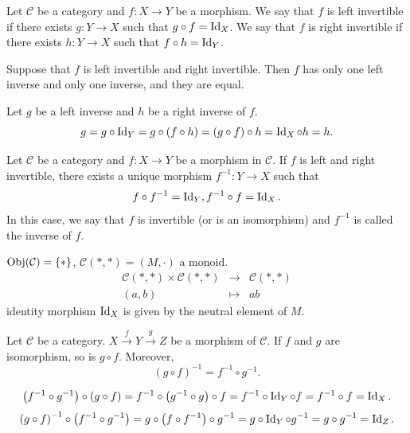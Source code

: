 \begin{definitionenv}
    Let $\mathcal{C}$ be a category and $f:X\rightarrow Y$ be a morphism. We say that $f$ is left invertible if there exists $g:Y\rightarrow X$ such that $g\circ f=\operatorname{\mathrm{Id}}_X$. We say that $f$ is right invertible if there exists $h:Y\rightarrow X$ such that $f\circ h=\operatorname{\mathrm{Id}}_Y$.
\end{definitionenv}
\begin{propositionenv}
    Suppose that $f$ is left invertible and right invertible. Then $f$ has only one left inverse and only one inverse, and they are equal.
\end{propositionenv}
\begin{proofenv}
    Let $g$ be a left inverse and $h$ be a right inverse of $f$.
    $$g = g\circ \operatorname{\mathrm{Id}}_Y = g\circ \left(f\circ h\right)= \left(g\circ f\right)\circ h = \operatorname{\mathrm{Id}}_X\circ h = h.$$
\end{proofenv}
\begin{definitionenv}
    Let $\mathcal{C}$ be a category and $f:X\rightarrow Y$ be a morphism in $\mathcal{C}$. If $f$ is left and right invertible, there exists a unique morphism $f^{-1}:Y\rightarrow X$ such that
    $$f\circ f^{-1}=\operatorname{\mathrm{Id}}_{Y}, f^{-1}\circ f=\operatorname{\mathrm{Id}}_{X}.$$
    In this case, we say that $f$ is invertible (or is an isomorphism) and $f^{-1}$ is called the inverse of $f$.
\end{definitionenv}
\begin{exampleenv}
    $\operatorname{\mathrm{Obj}}(\mathcal{C})=\{*\}$, $\mathcal{C}(*,*)=(M,\cdot)$ a monoid.
    $$\begin{array}{rcl}
        \mathcal{C}(*,*)\times\mathcal{C}(*,*)&\rightarrow&\mathcal{C}(*,*)\\
        (a,b)&\mapsto& ab
    \end{array}$$
    identity morphism $\operatorname{\mathrm{Id}}_X$ is given by the neutral element of $M$.
\end{exampleenv}
\begin{propositionenv}
    Let $\mathcal{C}$ be a category. $X\overset{f}{\rightarrow}Y\overset{g}{\rightarrow}Z$ be a morphism of $\mathcal{C}$. If $f$ and $g$ are isomorphism, so is $g\circ f$. Moreover,
    $$\left(g\circ f\right)^{-1} = f^{-1}\circ g^{-1}.$$
\end{propositionenv}
\begin{proofenv}
    $$\left(f^{-1}\circ g^{-1}\right) \circ\left(g\circ f\right) = f^{-1} \circ \left(g^{-1}\circ g\right)\circ f = f^{-1} \circ \operatorname{\mathrm{Id}}_{Y} \circ f = f^{-1}\circ f = \operatorname{\mathrm{Id}}_{X}.$$
    $$\left(g\circ f\right)^{-1} \circ \left(f^{-1}\circ g^{-1} \right) = g\circ\left(f\circ f^{-1}\right)\circ g^{-1} = g \circ \operatorname{\mathrm{Id}}_{Y} \circ g^{-1} = g\circ g^{-1} =\operatorname{\mathrm{Id}}_Z.$$
\end{proofenv}
